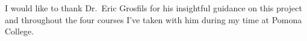 I would like to thank Dr.\ Eric Grosfils for his insightful guidance on this project and throughout the four courses I've taken with him during my time at Pomona College.